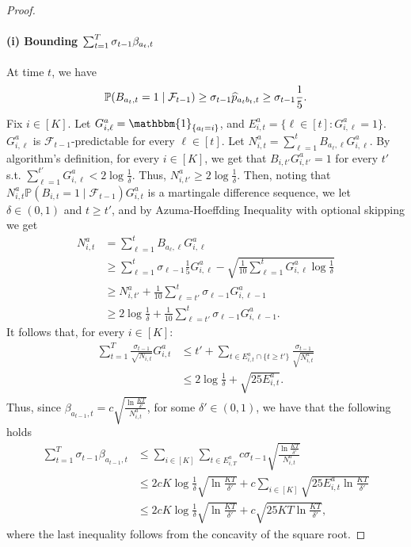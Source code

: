 \begin{proof}
    \paragraph{(i) Bounding $\sum_{t=1}^T\sigma_{t-1}\beta_{a_t, t}$}
     At time $t$, we have 
     \begin{align*}
         \mathbb{P}(B_{a_t,t} = 1 \mid \mathcal{F}_{t-1} ) \ge \sigma_{t-1}\widehat{p}_{a_t b_t, t} \ge \sigma_{t-1}\frac{1}{5}.
     \end{align*}
     Fix $i\in [K]$. Let $G_{i,\ell}^a = \mathbbm{1}_{\{a_{l} = i\}}$, and $E_{i,t}^a = \{ \ell \in [t] :  G_{i,\ell}^a=1\}$. $G_{i,{\ell}}^a$ is $\mathcal{F}_{t-1}$-predictable for every $\ell \in [t]$. Let $N_{i,t}^a = \sum_{\ell=1}^{t} B_{a_{\ell}, \ell} G_{i,\ell}^a$. By algorithm's definition, for every $i \in [K]$, we get that $B_{i,t'}G_{i,t'}^a = 1$ for every $t'$ s.t. $\sum_{\ell=1}^{t'} G_{i,\ell}^a < 2\log \frac{1}{\delta}$. Thus, $N_{i,t'}^a \ge 2\log \frac{1}{\delta}$. Then, noting that $N_{i,t}^a \mathbb{P}(B_{i,t} = 1 \mid \mathcal{F}_{t-1} )G_{i,t}^a$ is a martingale difference sequence, we let $\delta \in (0,1)$ and $t\ge t'$, and by Azuma-Hoeffding Inequality with optional skipping we get
    \begin{align*}
        N_{i,t}^a &= \sum_{\ell = 1}^{t} B_{a_{\ell}, \ell} G_{i,\ell}^a\\
        &\ge  \sum_{\ell = 1}^{t} \sigma_{\ell-1} \frac{1}{5}G_{i,\ell}^a - \sqrt{\frac{1}{10}\sum_{\ell = 1}^{t}G_{i,\ell}^a \log \frac{1}{\delta}} \\
        &\ge N_{i,t'}^a+\frac{1}{10}\sum_{\ell = t'}^{t} \sigma_{\ell-1} G_{i,\ell-1}^a \\
        &\ge 2\log\frac{1}{\delta}+\frac{1}{10}\sum_{\ell = t'}^{t} \sigma_{\ell-1} G_{i,\ell-1}^a.
    \end{align*}
    It follows that, for every $i \in [K]$:
    \begin{align*}
        \sum_{t =1}^T\frac{\sigma_{t-1}}{\sqrt{N_{i,t}}}G_{i,t}^a &\le t' + \sum_{t \in E_{i,t}^a \cap \{t\ge t'\}}\frac{\sigma_{t-1}}{\sqrt{N_{i,t}^a}} \\
        &\le 2\log \frac{1}{\delta} + \sqrt{2 5E_{i,t}^a}.
    \end{align*}
    Thus, since $\beta_{a_{t-1},t} = c\sqrt{\frac{\ln \frac{KT}{\delta'}}{N_{i,t}^a}}$, for some $\delta' \in (0,1)$, we have that the following holds
    \begin{align*}
        \sum_{t=1}^T \sigma_{t-1}\beta_{a_{t-1},t} &\le \sum_{i \in [K]} \sum_{t \in E_{i,T}^a} c\sigma_{t-1}\sqrt{\frac{\ln \frac{KT}{\delta'}}{N_{i,t}^a}}  \\
        &\le 2cK\log \frac{1}{\delta} \sqrt{ \ln \frac{KT}{\delta'}} + c\sum_{i \in [K]}\sqrt{2 5E_{i,t}^a \ln \frac{KT}{\delta'}} \\
        &\le 2cK\log \frac{1}{\delta} \sqrt{\ln \frac{KT}{\delta'}} + c\sqrt{25 KT \ln \frac{KT}{\delta'}},
    \end{align*}
    where the last inequality follows from the concavity of the square root.
    

\end{proof}
